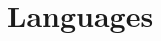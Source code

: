 \documentclass[10pt,a4paper,sans]{moderncv}
\begin{document}


























\vspace{-.2cm}
\section{\textbf{Languages}}
\end{document}
